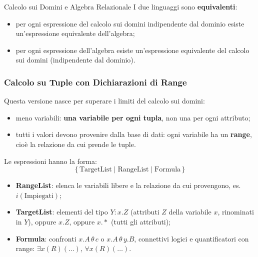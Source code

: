 \documentclass[12pt]{extarticle}
\begin{document}
\begin{cbox}{Calcolo sui Domini e Algebra Relazionale}
\noindent I due linguaggi sono \textbf{equivalenti}:
\begin{itemize}
    \item per ogni espressione del calcolo sui domini indipendente dal dominio esiste un'espressione equivalente dell'algebra;
    \item per ogni espressione dell'algebra esiste un'espressione equivalente del calcolo sui domini (indipendente dal dominio).
\end{itemize}
\end{cbox}

\subsubsection{Calcolo su Tuple con Dichiarazioni di Range}
\noindent Questa versione nasce per superare i limiti del calcolo sui domini:
\begin{itemize}
    \item meno variabili: \textbf{una variabile per ogni tupla}, non una per ogni attributo;
    \item tutti i valori devono provenire dalla base di dati: ogni variabile ha un \textbf{range}, cioè la relazione da cui prende le tuple.
\end{itemize}
Le espressioni hanno la forma:
\[
\{\, \text{TargetList} \mid \text{RangeList} \mid \text{Formula} \,\}
\]
\begin{itemize}
    \item \textbf{RangeList}: elenca le variabili libere e la relazione da cui provengono, es. $i(\text{Impiegati})$;
    \item \textbf{TargetList}: elementi del tipo $Y : x.Z$ (attributi $Z$ della variabile $x$, rinominati in $Y$), oppure $x.Z$, oppure $x.*$ (tutti gli attributi);
    \item \textbf{Formula}: confronti $x.A \,\theta\, c$ o $x.A \,\theta\, y.B$, connettivi logici e quantificatori con range: $\exists x(R)(\dots)$, $\forall x(R)(\dots)$.
\end{itemize}
\end{document}
